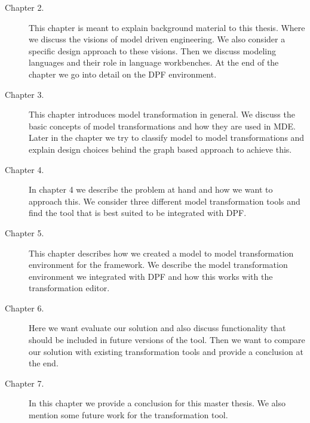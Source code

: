 \begin{description}
  \item[Chapter 2.] This chapter is meant to explain background material to this
  thesis. Where we discuss the visions of model driven engineering. We also
  consider a specific design approach to these visions. Then we discuss modeling
  languages and their role in language workbenches. At the end of the chapter we
  go into detail on the DPF environment. 
  
  \item[Chapter 3.] This chapter introduces model transformation in general. We
  discuss the basic concepts of model transformations and how they are used in
  MDE. Later in the chapter we try to classify model to model transformations
  and explain design choices behind the graph based approach to achieve this.
  
  
  \item[Chapter 4.] In chapter 4 we describe the problem at hand and how we want
  to approach this. We consider three different model transformation tools and
  find the tool that is best suited to be integrated with DPF. 
  
  
  \item[Chapter 5.] This chapter describes how we created a model
  to model transformation environment for the framework. We describe the model
  transformation environment we integrated with DPF and how this works with the
  transformation editor. 
  
  
  \item[Chapter 6.] Here we want evaluate our solution and also discuss
  functionality that should be included in future versions of the tool. Then we
  want to compare our solution with existing transformation tools and provide a
  conclusion at the end. 
  
  \item[Chapter 7.] In this chapter we provide a conclusion for this master
  thesis. We also mention some future work for the transformation tool. 
\end{description}